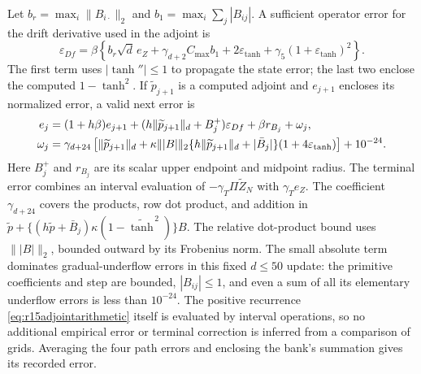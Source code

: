 Let $b_r=\max_i\|B_{i\cdot}\|_2$ and
$b_1=\max_i\sum_j|B_{ij}|$. A sufficient operator error for the
drift derivative used in the adjoint is
\begin{equation}
 \varepsilon_{Df}=\beta\left\{
 b_r\sqrt d\,e_Z+\gamma_{d+2}C_{\max}b_1
       +2\varepsilon_{\tanh}
       +\gamma_5(1+\varepsilon_{\tanh})^2\right\}.
 \label{eq:r15dfarithmetic}
\end{equation}
The first term uses $|\tanh''|\leq1$ to propagate the state error;
the last two enclose the computed $1-\tanh^2$.
If $\widetilde p_{j+1}$ is a computed adjoint and $e_{j+1}$ encloses
its normalized error, a valid next error is
\begin{align}
 e_j={}&(1+h\beta)e_{j+1}
       +(h\|\widetilde p_{j+1}\|_d+B_j^+)
                                      \varepsilon_{Df}
       +\beta r_{B_j}+\omega_j,\label{eq:r15adjointarithmetic}\\
 \omega_j={}&\gamma_{d+24}\left[
       \|\widetilde p_{j+1}\|_d+
       \kappa\||B|\|_2
       \{h\|\widetilde p_{j+1}\|_d+|\bar B_j|\}
                    (1+4\varepsilon_{\tanh})\right]+10^{-24}.
       \notag
\end{align}
Here $B_j^+$ and $r_{B_j}$ are its scalar upper endpoint and midpoint
radius. The terminal error combines an interval evaluation of
$-\gamma_T\Pi\widetilde Z_N$ with $\gamma_Te_Z$.
The coefficient $\gamma_{d+24}$ covers the products, row dot product,
and addition in
$\widetilde p+\{(h\widetilde p+\bar B_j)
\kappa(1-\widetilde{\tanh}^{\,2})\}B$.
The relative dot-product bound uses $\||B|\|_2$, bounded outward by
its Frobenius norm. The small absolute term dominates gradual-underflow
errors in this fixed $d\leq50$ update: the primitive coefficients and
step are bounded, $|B_{ij}|\leq1$, and even a sum of all its elementary
underflow errors is less than $10^{-24}$. The positive recurrence
\eqref{eq:r15adjointarithmetic} itself is evaluated by interval
operations, so no additional empirical error or terminal correction is
inferred from a comparison of grids. Averaging the four path errors
and enclosing the bank's summation gives its recorded error.

